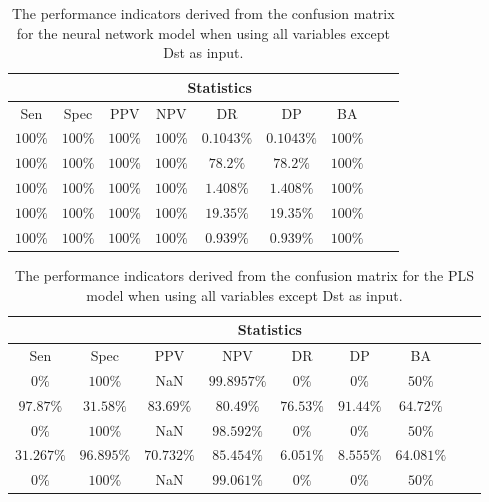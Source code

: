 \begin{table}[!ht]
	\centering
	\begin{tabular}{|c|c|c|c|c|c|c|c|c|}
		\hline
		 & \multicolumn{7}{c|}{Statistics} \\ \hline
		Sen & Spec & PPV & NPV & DR & DP & BA \\ \hline
		$100\%$ & $100\%$ & $100\%$ & $100\%$ & $0.1043\%$ & $0.1043\%$ & $100\%$ \\ \hline
		$100\%$ & $100\%$ & $100\%$ & $100\%$ & $78.2\%$ & $78.2\%$ & $100\%$ \\ \hline
		$100\%$ & $100\%$ & $100\%$ & $100\%$ & $1.408\%$ & $1.408\%$ & $100\%$ \\ \hline
		$100\%$ & $100\%$ & $100\%$ & $100\%$ & $19.35\%$ & $19.35\%$ & $100\%$ \\ \hline
		$100\%$ & $100\%$ & $100\%$ & $100\%$ & $0.939\%$ & $0.939\%$ & $100\%$ \\ \hline
	\end{tabular}
	\caption{The performance indicators derived from the confusion matrix for the neural network model when using all variables except Dst as input.}
	\label{tab:cs:noDst:nnet}
\end{table}

\begin{table}[!ht]
	\centering
	\begin{tabular}{|c|c|c|c|c|c|c|c|c|}
		\hline
		 & \multicolumn{7}{c|}{Statistics} \\ \hline
		Sen & Spec & PPV & NPV & DR & DP & BA \\ \hline
		$0\%$ & $100\%$ & NaN & $99.8957\%$ & $0\%$ & $0\%$ & $50\%$ \\ \hline
		$97.87\%$ & $31.58\%$ & $83.69\%$ & $80.49\%$ & $76.53\%$ & $91.44\%$ & $64.72\%$ \\ \hline
		$0\%$ & $100\%$ & NaN & $98.592\%$ & $0\%$ & $0\%$ & $50\%$ \\ \hline
		$31.267\%$ & $96.895\%$ & $70.732\%$ & $85.454\%$ & $6.051\%$ & $8.555\%$ & $64.081\%$ \\ \hline
		$0\%$ & $100\%$ & NaN & $99.061\%$ & $0\%$ & $0\%$ & $50\%$ \\ \hline
	\end{tabular}
	\caption{The performance indicators derived from the confusion matrix for the PLS model when using all variables except Dst as input.}
	\label{tab:cs:noDst:pls}
\end{table}

